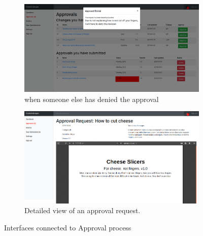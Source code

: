 \begin{figure}[H]\ContinuedFloat
	\centering
	\begin{subfigure}[b]{0.48\textwidth}
		\includegraphics[width=\textwidth]{billeder/iteration1Prototyper/ApprovalDenied.png}
		\caption{when someone else has denied the approval}
		\label{fig:3-ApproveDenied}
	\end{subfigure}
	\quad
	\begin{subfigure}[b]{0.48\textwidth}
		\includegraphics[width=\textwidth]{billeder/iteration1Prototyper/ApprovalRequest.png}
		\caption{Detailed view of an approval request.}
		\label{fig:3-ApproveRequest}
	\end{subfigure}
	\caption{Interfaces connected to Approval process}\label{fig:3-AprovalPages}
\end{figure}

